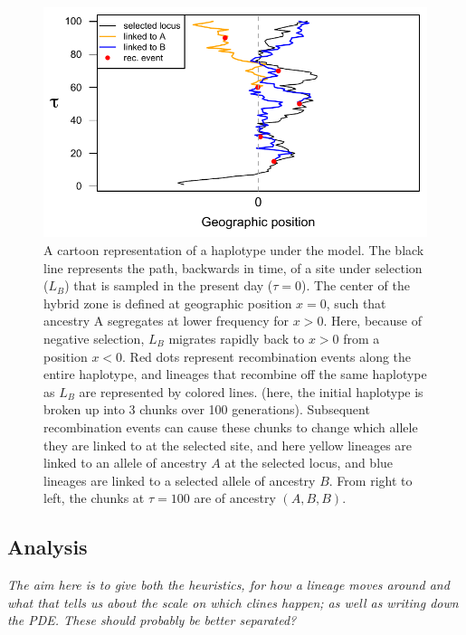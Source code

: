 \documentclass[12pt]{article}
\newcommand{\plr}[1]{{\em \color{blue} #1}}
\begin{document}
\begin{figure}
\includegraphics{figs/BM_schematic}
\caption{A cartoon representation of a haplotype under the model. The black line represents the path, backwards in time, of a site under selection ($L_B$) that is sampled in the present day ($\tau=0$). The center of the hybrid zone is defined at geographic position $x=0$, such that ancestry A segregates at lower frequency for $x>0$. Here, because of negative selection, $L_B$ migrates rapidly back to $x>0$ from a position $x<0$. Red dots represent recombination events along the entire haplotype, and lineages that recombine off the same haplotype as $L_B$ are represented by colored lines. (here, the initial haplotype is broken up into 3 chunks over 100 generations). Subsequent recombination events can cause these chunks to change which allele they are linked to at the selected site, and here yellow lineages are linked to an allele of ancestry $A$ at the selected locus, and blue lineages are linked to a selected allele of ancestry $B$. From right to left, the chunks at $\tau=100$ are of ancestry $(A, B, B)$. }\label{Fig:schematic}
\end{figure}


\subsection*{Analysis}

\plr{The aim here is to give both the heuristics, for how a lineage moves around
and what that tells us about the scale on which clines happen;
as well as writing down the PDE.  These should probably be better separated?}
\end{document}
